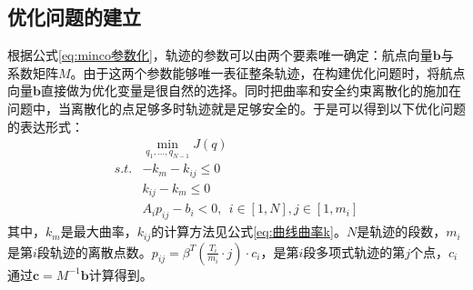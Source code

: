 \documentclass[master,academic]{ysuthesis} %
\begin{document}
		\subsection{优化问题的建立}
		根据公式\ref{eq:minco参数化}，轨迹的参数可以由两个要素唯一确定：航点向量$\mathbf{b}$与系数矩阵$M$。由于这两个参数能够唯一表征整条轨迹，在构建优化问题时，将航点向量$\mathbf{b}$直接做为优化变量是很自然的选择。同时把曲率和安全约束离散化的施加在问题中，当离散化的点足够多时轨迹就是足够安全的。于是可以得到以下优化问题的表达形式：
		\begin{equation}
			\begin{aligned}
				&\min_{q_1,...,q_{N-1}} J( q ) \\
				s.t.&-k_{m}-k_{ij}\le 0\\
				&k_{ij}-k_{m}\le 0 \\
				&A_ip_{ij}-b_i<0,\ \ i\in \left[ 1,N \right] ,j\in \left[ 1,m_i \right] 
			\end{aligned}
		\end{equation}
		其中，$k_{m}$是最大曲率，$k_{ij}$的计算方法见公式\ref{eq:曲线曲率k}。$N$是轨迹的段数，$m_i$是第$i$段轨迹的离散点数。$p_{ij}=\beta^T(\frac{T_i}{m_i}\cdot j)\cdot c_i$，是第$i$段多项式轨迹的第$j$个点，$c_i$通过$\mathbf{c} = M^{-1}\mathbf{b}$计算得到。
\end{document}
